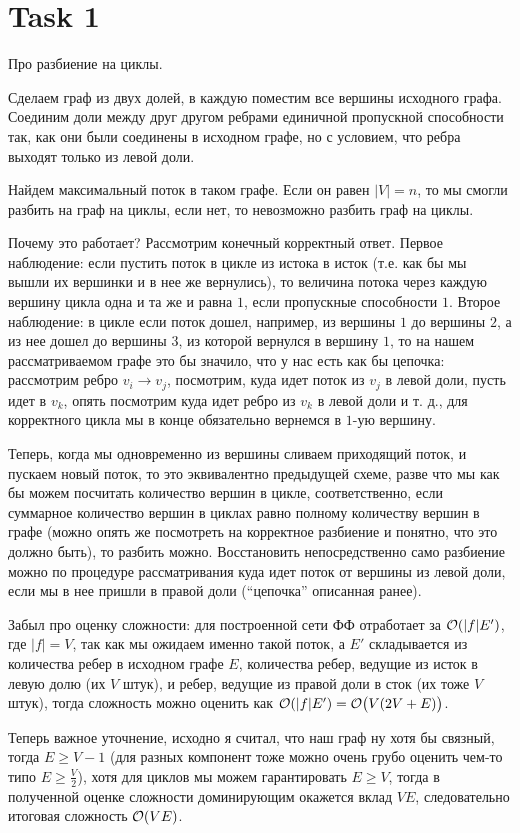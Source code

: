 \section{Task 1}
\begin{task}
    Про разбиение на циклы.
\end{task}

\begin{solution}
    Сделаем граф из двух долей, в каждую поместим все вершины исходного графа. Соединим доли между друг другом ребрами единичной пропускной способности так, как они были соединены в исходном графе, но с условием, что ребра выходят только из левой доли.
    
    Найдем максимальный поток в таком графе.
    Если он равен $|V| = n$, то мы смогли разбить на граф на циклы, если нет, то невозможно разбить граф на циклы.

    Почему это работает? Рассмотрим конечный корректный ответ.
    Первое наблюдение: если пустить поток в цикле из истока в исток (т.е. как бы мы вышли их вершинки и в нее же вернулись), то величина потока через каждую вершину цикла одна и та же и равна $1$, если пропускные способности $1$.
    Второе наблюдение: в цикле если поток дошел, например, из вершины $1$ до вершины $2$, а из нее дошел до вершины $3$, из которой вернулся в вершину $1$, то на нашем рассматриваемом графе это бы значило, что у нас есть как бы цепочка: рассмотрим ребро $v_i \rightarrow v_j$, посмотрим, куда идет поток из $v_j$ в левой доли, пусть идет в $v_k$, опять посмотрим куда идет ребро из $v_k$ в левой доли и т. д., для корректного цикла мы в конце обязательно вернемся в $1$-ую вершину.
    
    Теперь, когда мы одновременно из вершины сливаем приходящий поток, и пускаем новый поток, то это эквивалентно предыдущей схеме, разве что мы как бы можем посчитать количество вершин в цикле, соответственно, если суммарное количество вершин в циклах равно полному количеству вершин в графе (можно опять же посмотреть на корректное разбиение и понятно, что это должно быть), то разбить можно. Восстановить непосредственно само разбиение можно по процедуре рассматривания куда идет поток от вершины из левой доли, если мы в нее пришли в правой доли (``цепочка'' описанная ранее).

    \begin{upd}
        Забыл про оценку сложности: для построенной сети ФФ отработает за $\mathcal{O}(|f|E')$, где $|f| = V$, так как мы ожидаем именно такой поток, а $E'$ складывается из количества ребер в исходном графе $E$, количества ребер, ведущие из исток в левую долю (их $V$ штук), и ребер, ведущие из правой доли в сток (их тоже $V$ штук), тогда сложность можно оценить как $\mathcal{O}(|f|E') = \mathcal{O}\big(V(2V + E)\big)$.
        
        Теперь важное уточнение, исходно я считал, что наш граф ну хотя бы связный, тогда $E \geq V - 1$ (для разных компонент тоже можно очень грубо оценить чем-то типо $E \geq \frac{V}{2}$), хотя для циклов мы можем гарантировать $E \geq V$, тогда в полученной оценке сложности доминирующим окажется вклад $VE$, следовательно итоговая сложность $\mathcal{O}(VE)$.
    \end{upd}
\end{solution}